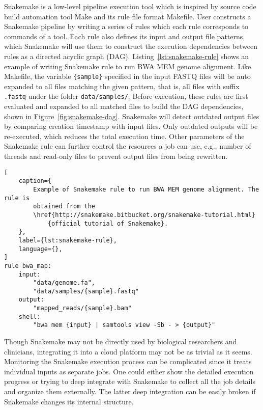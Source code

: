 Snakemake \cite{koster2012:snakemakea} is a low-level pipeline execution tool
which is inspired by source code build automation tool Make \cite{:gnu-make}
and its rule file format Makefile. User constructs a Snakemake pipeline by
writing a series of rules which each rule corresponds to commands of a tool.
Each rule also defines its input and output file patterns, which Snakemake will
use them to construct the execution dependencies between rules as a directed
acyclic graph (DAG). Listing~\ref{lst:snakemake-rule} shows an example of
writing Snakemake rule to run BWA MEM genome alignment. Like Makefile, the
variable \texttt{\{sample\}} specified in the input FASTQ files will be auto
expanded to all files matching the given pattern, that is, all files with
suffix \texttt{.fastq} under the folder \texttt{data/samples/}. Before
execution, these rules are first evaluated and expanded to all matched files to
build the DAG dependencies, shown in Figure~\ref{fig:snakemake-dag}. Snakemake
will detect outdated output files by comparing creation timestamp with input
files. Only outdated outputs will be re-executed, which reduces the total
execution time. Other parameters of the Snakemake rule can further control the
resources a job can use, e.g., number of threads and read-only files to prevent
output files from being rewritten.

\begin{lstlisting}[
    caption={
        Example of Snakemake rule to run BWA MEM genome alignment. The rule is
        obtained from the
        \href{http://snakemake.bitbucket.org/snakemake-tutorial.html}
            {official tutorial of Snakemake}.
    },
    label={lst:snakemake-rule},
    language={},
]
rule bwa_map:
    input:
        "data/genome.fa",
        "data/samples/{sample}.fastq"
    output:
        "mapped_reads/{sample}.bam"
    shell:
        "bwa mem {input} | samtools view -Sb - > {output}"
\end{lstlisting}



Though Snakemake may not be directly used by biological researchers and
clinicians, integrating it into a cloud platform may not be as trivial as it
seems. Monitoring the Snakemake execution process can be complicated since it
treats individual inputs as separate jobs. One could either show the detailed
execution progress or trying to deep integrate with Snakemake to collect all
the job details and organize them externally. The latter deep integration can
be easily broken if Snakemake changes its internal structure.

